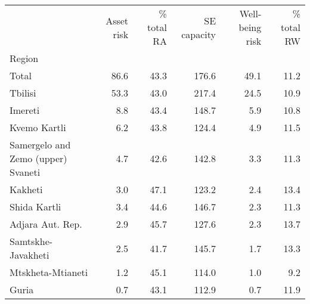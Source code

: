 \begin{tabular}{lrrrrr}
\toprule
{} &  Asset risk &  \% total RA &  SE capacity &  Well-being risk &  \% total RW \\
Region                             &             &             &              &                  &             \\
\midrule
Total                              &        86.6 &        43.3 &        176.6 &             49.1 &        11.2 \\
Tbilisi                            &        53.3 &        43.0 &        217.4 &             24.5 &        10.9 \\
Imereti                            &         8.8 &        43.4 &        148.7 &              5.9 &        10.8 \\
Kvemo Kartli                       &         6.2 &        43.8 &        124.4 &              4.9 &        11.5 \\
Samergelo and Zemo (upper) Svaneti &         4.7 &        42.6 &        142.8 &              3.3 &        11.3 \\
Kakheti                            &         3.0 &        47.1 &        123.2 &              2.4 &        13.4 \\
Shida Kartli                       &         3.4 &        44.6 &        146.7 &              2.3 &        11.3 \\
Adjara Aut. Rep.                   &         2.9 &        45.7 &        127.6 &              2.3 &        13.7 \\
Samtskhe-Javakheti                 &         2.5 &        41.7 &        145.7 &              1.7 &        13.3 \\
Mtskheta-Mtianeti                  &         1.2 &        45.1 &        114.0 &              1.0 &         9.2 \\
Guria                              &         0.7 &        43.1 &        112.9 &              0.7 &        11.9 \\
\bottomrule
\end{tabular}
